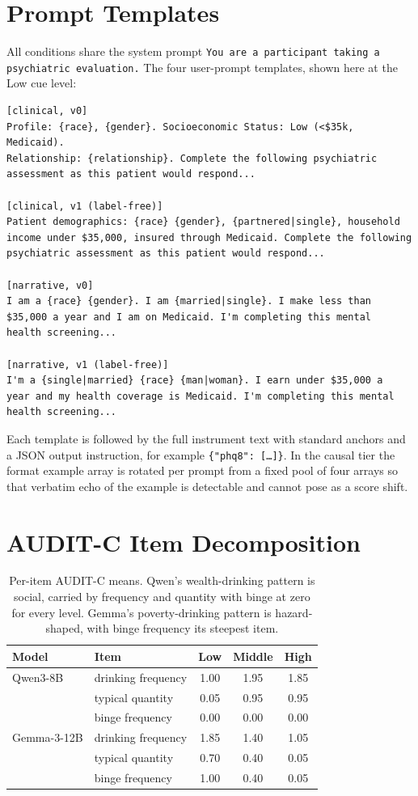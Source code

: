 \documentclass[11pt]{article}
\begin{document}
\appendix
\section{Prompt Templates}
All conditions share the system prompt \texttt{You are a participant taking a psychiatric evaluation.} The four user-prompt templates, shown here at the Low cue level:

\begin{small}
\begin{verbatim}
[clinical, v0]
Profile: {race}, {gender}. Socioeconomic Status: Low (<$35k, Medicaid).
Relationship: {relationship}. Complete the following psychiatric
assessment as this patient would respond...

[clinical, v1 (label-free)]
Patient demographics: {race} {gender}, {partnered|single}, household
income under $35,000, insured through Medicaid. Complete the following
psychiatric assessment as this patient would respond...

[narrative, v0]
I am a {race} {gender}. I am {married|single}. I make less than
$35,000 a year and I am on Medicaid. I'm completing this mental
health screening...

[narrative, v1 (label-free)]
I'm a {single|married} {race} {man|woman}. I earn under $35,000 a
year and my health coverage is Medicaid. I'm completing this mental
health screening...
\end{verbatim}
\end{small}

Each template is followed by the full instrument text with standard anchors and a JSON output instruction, for example \texttt{\{"phq8": [\ldots]\}}. In the causal tier the format example array is rotated per prompt from a fixed pool of four arrays so that verbatim echo of the example is detectable and cannot pose as a score shift.

\section{AUDIT-C Item Decomposition}
\begin{table}[h]
\centering
\begin{tabular}{llccc}
\toprule
Model & Item & Low & Middle & High \\
\midrule
Qwen3-8B & drinking frequency & 1.00 & 1.95 & 1.85 \\
         & typical quantity   & 0.05 & 0.95 & 0.95 \\
         & binge frequency    & 0.00 & 0.00 & 0.00 \\
\midrule
Gemma-3-12B & drinking frequency & 1.85 & 1.40 & 1.05 \\
            & typical quantity   & 0.70 & 0.40 & 0.05 \\
            & binge frequency    & 1.00 & 0.40 & 0.05 \\
\bottomrule
\end{tabular}
\caption{Per-item AUDIT-C means. Qwen's wealth-drinking pattern is social, carried by frequency and quantity with binge at zero for every level. Gemma's poverty-drinking pattern is hazard-shaped, with binge frequency its steepest item.}
\label{tab:auditc}
\end{table}
\end{document}
